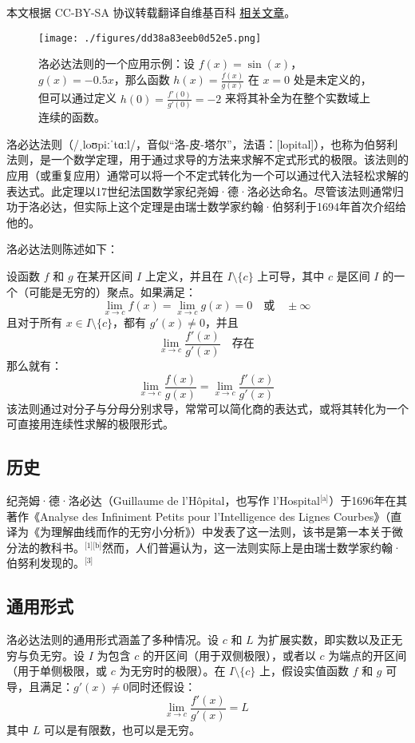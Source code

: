 
本文根据 CC-BY-SA 协议转载翻译自维基百科 \href{https://en.wikipedia.org/wiki/L\%27H\%C3\%B4pital\%27s_rule}{相关文章}。

\begin{figure}[ht]
\centering
\texttt{[image: ./figures/dd38a83eeb0d52e5.png]}
\caption{洛必达法则的一个应用示例：设 $f(x) = \sin(x)$，$g(x) = -0.5x$，那么函数 $h(x) = \frac{f(x)}{g(x)}$ 在 $x = 0$ 处是未定义的，但可以通过定义 $h(0) = \frac{f'(0)}{g'(0)} = -2$ 来将其补全为在整个实数域上连续的函数。} \label{fig_LbdFZ_2}
\end{figure}
洛必达法则（/ˌloʊpiːˈtɑːl/，音似“洛-皮-塔尔”，法语：[lopital]），也称为伯努利法则，是一个数学定理，用于通过求导的方法来求解不定式形式的极限。该法则的应用（或重复应用）通常可以将一个不定式转化为一个可以通过代入法轻松求解的表达式。此定理以17世纪法国数学家纪尧姆·德·洛必达命名。尽管该法则通常归功于洛必达，但实际上这个定理是由瑞士数学家约翰·伯努利于1694年首次介绍给他的。

洛必达法则陈述如下：

设函数 $f$ 和 $g$ 在某开区间 $I$ 上定义，并且在 $I \setminus \{c\}$ 上可导，其中 $c$ 是区间 $I$ 的一个（可能是无穷的）聚点。如果满足：
$$
\lim_{x \to c} f(x) = \lim_{x \to c} g(x) = 0 \quad \text{或} \quad \pm \infty~
$$
且对于所有 $x \in I \setminus \{c\}$，都有 $g'(x) \ne 0$，并且
$$
\lim_{x \to c} \frac{f'(x)}{g'(x)} \quad \text{存在}~
$$
那么就有：
$$
\lim_{x \to c} \frac{f(x)}{g(x)} = \lim_{x \to c} \frac{f'(x)}{g'(x)}~
$$
该法则通过对分子与分母分别求导，常常可以简化商的表达式，或将其转化为一个可直接用连续性求解的极限形式。
\subsection{历史}
纪尧姆·德·洛必达（Guillaume de l'Hôpital，也写作 l'Hospital\(^\text{[a]}\)）于1696年在其著作《Analyse des Infiniment Petits pour l'Intelligence des Lignes Courbes》（直译为《为理解曲线而作的无穷小分析》）中发表了这一法则，该书是第一本关于微分法的教科书。\(^\text{[1][b]}\)然而，人们普遍认为，这一法则实际上是由瑞士数学家约翰·伯努利发现的。\(^\text{[3]}\)
\subsection{通用形式}

洛必达法则的通用形式涵盖了多种情况。设 $c$ 和 $L$ 为扩展实数，即实数以及正无穷与负无穷。设 $I$ 为包含 $c$ 的开区间（用于双侧极限），或者以 $c$ 为端点的开区间（用于单侧极限，或 $c$ 为无穷时的极限）。在 $I \setminus \{c\}$ 上，假设实值函数 $f$ 和 $g$ 可导，且满足：$g'(x) \ne 0$同时还假设：
$$
\lim_{x \to c} \frac{f'(x)}{g'(x)} = L~
$$
其中 $L$ 可以是有限数，也可以是无穷。

